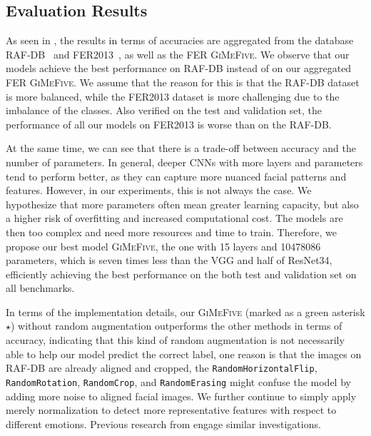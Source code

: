 \subsection{Evaluation Results}
\label{sec:evaluation:results}

As seen in , 
the results in terms of accuracies are aggregated from the database RAF-DB~\cite{kaggle_rafdb} and FER2013~\cite{kaggle_fer}, 
as well as the FER \textsc{GiMeFive}. 
We observe that our models achieve the best performance on RAF-DB instead of on our aggregated FER \textsc{GiMeFive}. 
We assume that the reason for this is that the RAF-DB dataset is more balanced, 
while the FER2013 dataset is more challenging due to the imbalance of the classes. 
Also verified on the test and validation set, 
the performance of all our models on FER2013 is worse than on the RAF-DB. 

At the same time, 
we can see that there is a trade-off between accuracy and the number of parameters. 
In general, 
deeper CNNs with more layers and parameters tend to perform better, 
as they can capture more nuanced facial patterns and features. 
However, in our experiments, 
this is not always the case. 
We hypothesize that more parameters often mean greater learning capacity, 
but also a higher risk of overfitting and increased computational cost. 
The models are then too complex and need more resources and time to train. 
Therefore, we propose our best model \textsc{GiMeFive}, 
the one with 15 layers and 10478086 parameters, 
which is seven times less than the VGG and half of ResNet34, 
efficiently achieving the best performance on the both test and validation set on all benchmarks. 

In terms of the implementation details, 
our \textsc{GiMeFive} 
(marked as a green asterisk \textcolor{LMUGreen}{$\star$}) without random augmentation outperforms the other methods in terms of accuracy, 
indicating that this kind of random augmentation is not necessarily able to help our model predict the correct label, 
one reason is that the images on RAF-DB are already aligned and cropped, 
the \texttt{RandomHorizontalFlip}, \texttt{RandomRotation}, 
\texttt{RandomCrop}, and \texttt{RandomErasing} might confuse the model by adding more noise to aligned facial images. 
We further continue to simply apply merely normalization to detect more representative features with respect to different emotions.
Previous research from \citet{ZeilerF14,li_reliable_2017,VermaMRMV23} engage similar investigations. %

